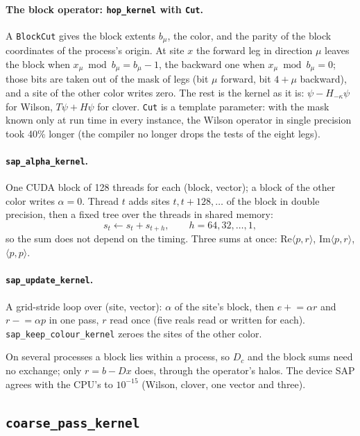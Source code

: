 \documentclass[11pt,a4paper]{article}
\numberwithin{equation}{section}
\newcommand{\code}[1]{\texttt{\small #1}}
\begin{document}
\paragraph{The block operator: \code{hop\_kernel} with \code{Cut}.} A \code{BlockCut} gives the
block extents $b_\mu$, the color, and the parity of the block coordinates of the process's
origin. At site $x$ the forward leg in direction $\mu$ leaves the block when
$x_\mu \bmod b_\mu = b_\mu-1$, the backward one when $x_\mu \bmod b_\mu = 0$; those bits are taken
out of the mask of legs (bit $\mu$ forward, bit $4+\mu$ backward), and a site of the other color
writes zero. The rest is the kernel as it is: $\psi - H_{-\kappa}\psi$ for Wilson, $T\psi + H\psi$ for
clover. \code{Cut} is a template parameter: with the mask known only at run time in every
instance, the Wilson operator in single precision took 40\% longer (the compiler no longer drops
the tests of the eight legs).

\paragraph{\code{sap\_alpha\_kernel}.} One CUDA block of 128 threads for each (block, vector); a
block of the other color writes $\alpha=0$. Thread $t$ adds sites $t, t+128,\dots$ of the block in
double precision, then a fixed tree over the threads in shared memory:
\begin{equation}
s_t \leftarrow s_t + s_{t+h},\qquad h = 64, 32, \dots, 1,
\end{equation}
so the sum does not depend on the timing. Three sums at once: $\mathrm{Re}\langle p,r\rangle$,
$\mathrm{Im}\langle p,r\rangle$, $\langle p,p\rangle$.

\paragraph{\code{sap\_update\_kernel}.} A grid-stride loop over (site, vector): $\alpha$ of the
site's block, then $e \mathrel{+}= \alpha r$ and $r \mathrel{-}= \alpha p$ in one pass, $r$ read once
(five reals read or written for each). \code{sap\_keep\_colour\_kernel} zeroes the sites of the
other color.

On several processes a block lies within a process, so $D_c$ and the block sums need no
exchange; only $r=b-Dx$ does, through the operator's halos. The device SAP agrees with the CPU's
to $10^{-15}$ (Wilson, clover, one vector and three).

\subsection{\code{coarse\_pass\_kernel}}
\end{document}
